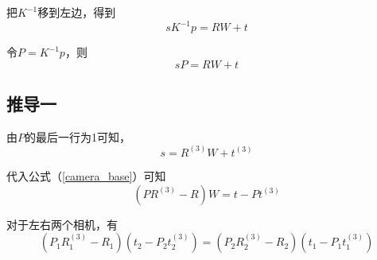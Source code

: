 \documentclass{ctexart}
\begin{document}
	把$K^{-1}$移到左边，得到
	\begin{equation}
	sK^{-1}p=RW+t
	\end{equation}
	
	令$P=K^{-1}p$，则
	\begin{equation}
	sP=RW+t \label{camera_base}
	\end{equation}
	
	\subsection{推导一}
	由$P$的最后一行为1可知，
	\begin{equation}
	s=R^{(3)}W+t^{(3)}
	\end{equation}
	
	代入公式（\ref{camera_base}）可知
	\begin{equation}
	(PR^{(3)}-R)W=t-Pt^{(3)} \label{wrong_label}
	\end{equation}
	
	对于左右两个相机，有
	\begin{equation}
	(P_1 R_1^{(3)} - R_1)(t_2 - P_2 t_2^{(3)})=
	(P_2 R_2^{(3)} - R_2)(t_1 - P_1 t_1^{(3)})
	\end{equation}
	
\end{document}
